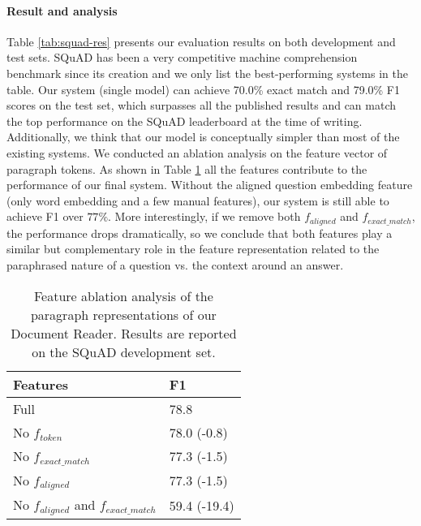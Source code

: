 \documentclass[11pt,a4paper]{article}
\newcommand{\finalem}{70.0}
\newcommand{\finalf}{79.0}
\begin{document}
\paragraph{Result and analysis} Table \ref{tab:squad-res} presents our evaluation results on both development and test sets. SQuAD has been a very competitive machine comprehension benchmark since its creation and we only list the best-performing systems in the table. Our system (single model) can achieve {\finalem}\% exact match and {\finalf}\% F1 scores on the test set, which surpasses all the published results and can match the top performance on the SQuAD leaderboard at the time of writing. Additionally, we think that our model is conceptually simpler than most of the existing systems. We conducted an ablation analysis on the feature vector of paragraph tokens. As shown in Table \ref{tab:feature-ablation} all the features contribute to the performance of our final system. Without the aligned question embedding feature (only word embedding and a few manual features), our system is still able to achieve F1 over $77\%$. More interestingly, if we remove both $f_{aligned}$ and $f_{exact\_match}$, the performance drops dramatically, so we conclude that both features play a similar but complementary role in the feature representation related to the paraphrased nature of a question vs. the context around an answer.

\begin{table}
	\begin{center}
	\begin{tabular}{l | l}
    \hline
    \bf Features & \bf F1\\
    \hline
    Full & 78.8 \\
    \hline
    No $f_{token}$ & 78.0 (-0.8)\\
    No $f_{exact\_match}$ & 77.3 (-1.5)\\
    No $f_{aligned}$ & 77.3 (-1.5)\\
    No $f_{aligned}$ and $f_{exact\_match}$ & 59.4 (-19.4) \\
    \hline
    \end{tabular}
    \end{center}
    \caption{\label{tab:feature-ablation}Feature ablation analysis of the paragraph representations of our Document Reader. Results are reported on the SQuAD development set.}
\end{table}
\end{document}
